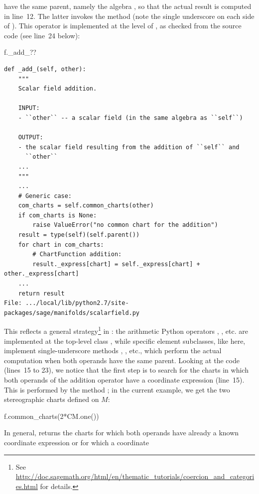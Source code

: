 have the same parent, namely the algebra , so that the actual
result is computed in line~12. The latter invokes the method 
(note the single underscore on each side of ). This operator is
implemented at the level of , as checked from the source code (see line~24 below):
\begin{NBin}
f._add_??
\end{NBin}
\begin{lstlisting}
def _add_(self, other):
    """
    Scalar field addition.

    INPUT:
    - ``other`` -- a scalar field (in the same algebra as ``self``)

    OUTPUT:
    - the scalar field resulting from the addition of ``self`` and
      ``other``
    ...
    """
    ...
    # Generic case:
    com_charts = self.common_charts(other)
    if com_charts is None:
        raise ValueError("no common chart for the addition")
    result = type(self)(self.parent())
    for chart in com_charts:
        # ChartFunction addition:
        result._express[chart] = self._express[chart] + other._express[chart]
    ...
    return result
File: .../local/lib/python2.7/site-packages/sage/manifolds/scalarfield.py
\end{lstlisting}
This reflects a general strategy\footnote{See \url{http://doc.sagemath.org/html/en/thematic_tutorials/coercion_and_categories.html} for details.} in \Sage{}: the arithmetic Python operators
, , etc. are implemented at the
top-level class , while specific element subclasses,
like  here, implement single-underscore methods
, , etc., which perform the actual computation
when both operands have the same parent.
Looking at the code (lines~15 to 23), we notice that the first step is to search
for the charts in which both operands of the addition operator have a coordinate
expression (line~15). This is performed by the method ;
in the current example, we get the two stereographic charts defined on $M$:
\begin{NBin}
f.common_charts(2*CM.one())
\end{NBin}
\begin{NBoutM}
\end{NBoutM}
In general,  returns the charts for which both operands
have already a known coordinate expression or for which a coordinate
